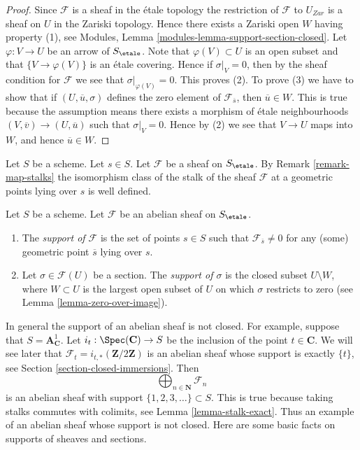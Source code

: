 \begin{proof}
Since $\mathcal{F}$ is a sheaf in the \'etale topology the restriction of
$\mathcal{F}$ to $U_{Zar}$ is a sheaf on $U$ in the Zariski topology.
Hence there exists a Zariski open $W$ having property (1), see
Modules, Lemma \ref{modules-lemma-support-section-closed}. Let
$\varphi : V \to U$ be an arrow of $S_\etale$. Note that
$\varphi(V) \subset U$ is an open subset and that
$\{V \to \varphi(V)\}$ is an \'etale covering. Hence if
$\sigma|_V = 0$, then by the sheaf condition for $\mathcal{F}$ we
see that $\sigma|_{\varphi(V)} = 0$. This proves (2).
To prove (3) we have to show that if $(U, \overline{u}, \sigma)$
defines the zero element of $\mathcal{F}_{\overline{s}}$, then
$\overline{u} \in W$. This is true because the assumption means
there exists a morphism of \'etale neighbourhoods
$(V, \overline{v}) \to (U, \overline{u})$ such that
$\sigma|_V = 0$. Hence by (2) we see that $V \to U$ maps into $W$, and
hence $\overline{u} \in W$.
\end{proof}

\noindent
Let $S$ be a scheme. Let $s \in S$.
Let $\mathcal{F}$ be a sheaf on $S_\etale$. By
Remark \ref{remark-map-stalks}
the isomorphism class of the stalk of the sheaf $\mathcal{F}$
at a geometric points lying over $s$ is well defined.

\begin{definition}
\label{definition-support}
Let $S$ be a scheme.
Let $\mathcal{F}$ be an abelian sheaf on $S_\etale$.
\begin{enumerate}
\item The {\it support of $\mathcal{F}$} is the set of
points $s \in S$ such that $\mathcal{F}_{\overline{s}} \not = 0$
for any (some) geometric point $\overline{s}$ lying over $s$.
\item Let $\sigma \in \mathcal{F}(U)$ be a section.
The {\it support of $\sigma$} is the closed subset $U \setminus W$, where
$W \subset U$ is the largest open subset of $U$ on which $\sigma$
restricts to zero (see
Lemma \ref{lemma-zero-over-image}).
\end{enumerate}
\end{definition}

\noindent
In general the support of an abelian sheaf is not closed.
For example, suppose that $S = \mathbf{A}^1_{\mathbf{C}}$.
Let $i_t : \Spec(\mathbf{C}) \to S$ be the inclusion of the
point $t \in \mathbf{C}$.
We will see later that $\mathcal{F}_t = i_{t, *}(\mathbf{Z}/2\mathbf{Z})$
is an abelian sheaf whose support is exactly $\{t\}$, see
Section \ref{section-closed-immersions}.
Then
$$
\bigoplus\nolimits_{n \in \mathbf{N}} \mathcal{F}_n
$$
is an abelian sheaf with support $\{1, 2, 3, \ldots\} \subset S$.
This is true because taking stalks commutes with colimits, see
Lemma \ref{lemma-stalk-exact}.
Thus an example of an abelian sheaf whose support is not closed.
Here are some basic facts on supports of sheaves and sections.

